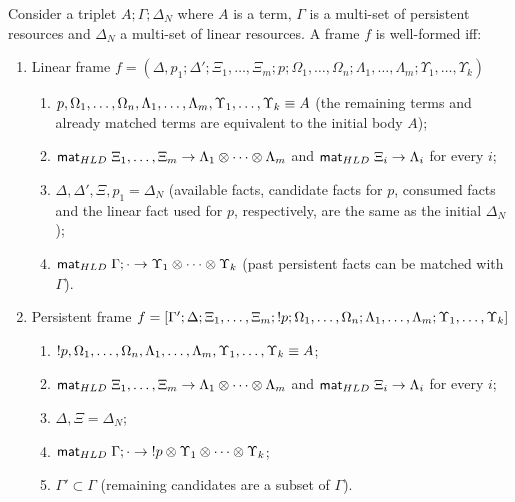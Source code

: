 \begin{definition}

Consider a triplet $A; \Gamma; \Delta_{N}$ where $A$ is a term, $\Gamma$ is a
multi-set of persistent resources and $\Delta_{N}$ a multi-set of linear
resources. A frame $f$ is well-formed iff:

\begin{enumerate}
   \item Linear frame $f = (\Delta, p_1; \Delta'; \Xi_1, \dotsc, \Xi_m; p;
         \Omega_1, \dotsc, \Omega_n; \Lambda_1, \dotsc, \Lambda_m; \Upsilon_1,
         \dotsc, \Upsilon_k)$

   \begin{enumerate}
      \item $p, \Omega_1, \dotsc, \Omega_n, \Lambda_1, \dotsc, \Lambda_m,
         \Upsilon_1, \dotsc, \Upsilon_k \equiv A$ (the remaining terms and already
               matched terms are equivalent to the initial body $A$);
      \item $\mathsf{mat}_{HLD} \; \Xi_1, \dotsc, \Xi_m \rightarrow \Lambda_1 \otimes \dotsb \otimes
      \Lambda_m$ and $\mathsf{mat}_{HLD} \; \Xi_i \rightarrow \Lambda_i$ for every $i$;

      \item $\Delta, \Delta', \Xi, p_1 = \Delta_{N}$ (available facts, candidate
            facts for $p$, consumed facts and the linear fact used for $p$,
            respectively, are the same as the initial $\Delta_{N}$);

      \item $\mathsf{mat}_{HLD} \; \Gamma; \cdot \rightarrow \Upsilon_1 \otimes \dotsb \otimes
      \Upsilon_k$ (past persistent facts can be matched with $\Gamma$).

   \end{enumerate}
   \item Persistent frame $f = [\Gamma'; \Delta; \Xi_1, \dotsc, \Xi_m; {!} p;
         \Omega_1, \dotsc, \Omega_n; \Lambda_1, \dotsc, \Lambda_m; \Upsilon_1,
         \dotsc, \Upsilon_k]$

      \begin{enumerate}
         \item ${!} p, \Omega_1, \dotsc, \Omega_n, \Lambda_1, \dotsc,
                     \Lambda_m, \Upsilon_1, \dotsc, \Upsilon_k \equiv A$;
         \item $\mathsf{mat}_{HLD} \; \Xi_1, \dots, \Xi_m \rightarrow \Lambda_1 \otimes \dotsb \otimes
                     \Lambda_m$ and $\mathsf{mat}_{HLD} \; \Xi_i \rightarrow \Lambda_i$ for every $i$;
         \item $\Delta, \Xi = \Delta_{N}$;
         \item $\mathsf{mat}_{HLD} \; \Gamma; \cdot \rightarrow {!} p \otimes \Upsilon_1 \otimes
                     \dotsb \otimes \Upsilon_k$;
         \item $\Gamma' \subset \Gamma$ (remaining candidates are a subset of
                     $\Gamma$).
      \end{enumerate}
\end{enumerate}
\end{definition}


